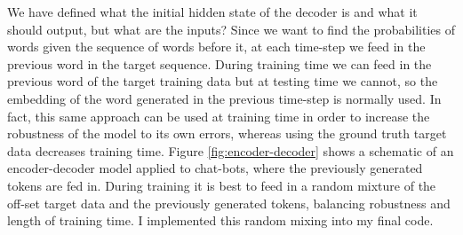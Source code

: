 \documentclass[]{article}
\begin{document}
We have defined what the initial hidden state of the decoder is and what it should output, but what are the inputs? Since we want to find the probabilities of words given the sequence of words before it, at each time-step we feed in the previous word in the target sequence. During training time we can feed in the previous word of the target training data but at testing time we cannot, so the embedding of the word generated in the previous time-step is normally used. In fact, this same approach can be used at training time in order to increase the robustness of the model to its own errors, whereas using the ground truth target data decreases training time. Figure \ref{fig:encoder-decoder} shows a schematic of an encoder-decoder model applied to chat-bots, where the previously generated tokens are fed in. During training it is best to feed in a random mixture of the off-set target data and the previously generated tokens, balancing robustness and length of training time. I implemented this random mixing into my final code. 
\end{document}
